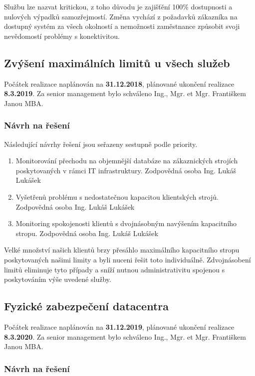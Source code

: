 \documentclass[11pt, a4paper, titlepage]{article}
\begin{document}
	Službu lze nazvat kritickou, z toho důvodu je zajišťění 100\% dostupnosti a nulových výpadků samozřejmostí. Změna vychází z požadavků zákazníka na dostupný systém za všech okolností a nemožnosti zaměstnance způsobit svoji nevědomostí problémy s konektivitou.

	\subsection{Zvýšení maximálních limitů u všech služeb}

	Počátek realizace naplánován na \textbf{31.12.2018}, plánované ukončení realizace \textbf{8.3.2019}. Za senior management bylo schváleno Ing., Mgr. et Mgr. Františkem Janou MBA.

	\subsubsection{Návrh na řešení}

	Následující návrhy řešení jsou seřazeny sestupně podle priority.

	\begin{enumerate}
		\item Monitorování přechodu na objemnější databáze na zákaznických strojích poskytovaných v rámci IT infrastruktury. Zodpovědná osoba Ing. Lukáš Lukášek
	 	\item Vyšetřenů problému s nedostatečnou kapacitou klientských strojů. Zodpovědná osoba Ing. Lukáš Lukášek
	 	\item Monitoring spokojenosti klientů s dvojnásobným navýšením kapacitního stropu. Zodpovědná osoba Ing. Lukáš Lukášek
	\end{enumerate}

	Velké množství našich klientů brzy přesáhlo maximálního kapacitního stropu poskytovaných našimi limity a byli nuceni řešit toto individuálně. Zdvojnásobení limitů eliminuje tyto případy a sníží nutnou administrativitu spojenou s poskytováním výše uvedené služby.

	\subsection{Fyzické zabezpečení datacentra}

	Počátek realizace naplánován na \textbf{31.12.2019}, plánované ukončení realizace \textbf{8.3.2020}. Za senior management bylo schváleno Ing., Mgr. et Mgr. Františkem Janou MBA.

	\subsubsection{Návrh na řešení}
\end{document}
